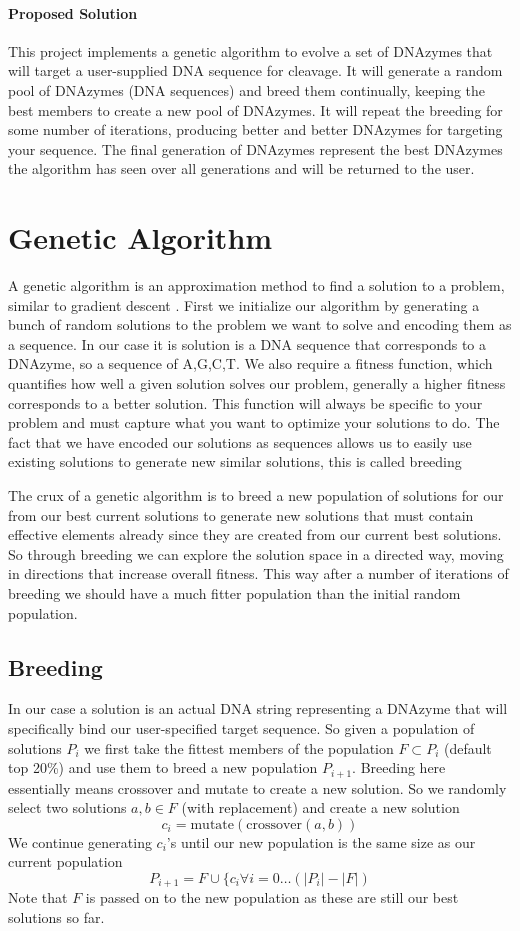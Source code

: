 \documentclass[11pt]{article}
\begin{document}
\paragraph{\textbf{Proposed Solution}}
This project implements a genetic algorithm to evolve a set of DNAzymes that will target a user-supplied DNA sequence for cleavage.
It will generate a random pool of DNAzymes (DNA sequences) and breed them continually, keeping the best members to create a new pool of DNAzymes.
It will repeat the breeding for some number of iterations, producing better and better DNAzymes for targeting your sequence.
The final generation of DNAzymes represent the best DNAzymes the algorithm has seen over all generations and will be returned to the user.

\section*{Genetic Algorithm}
A genetic algorithm is an approximation method to find a solution to a problem, similar to gradient descent \citep{ga}.
First we initialize our algorithm by generating a bunch of random solutions to the problem we want to solve and encoding them as a sequence.
In our case it is solution is a DNA sequence that corresponds to a DNAzyme, so a sequence of A,G,C,T.
We also require a fitness function, which quantifies how well a given solution solves our problem, generally a higher fitness corresponds to a better solution.
This function will always be specific to your problem and must capture what you want to optimize your solutions to do.
The fact that we have encoded our solutions as sequences allows us to easily use existing solutions to generate new similar solutions, this is called breeding
\par
The crux of a genetic algorithm is to breed a new population of solutions for our from our best current solutions to generate new solutions that must contain effective elements already since they are created from our current best solutions.
So through breeding we can explore the solution space in a directed way, moving in directions that increase overall fitness.
This way after a number of iterations of breeding we should have a much fitter population than the initial random population.

\subsection*{Breeding}
In our case a solution is an actual DNA string representing a DNAzyme that will specifically bind our user-specified target sequence.
So given a population of solutions $P_i$ we first take the fittest members of the population $F \subset P_i$ (default top 20\%) and use them to breed a new population $P_{i+1}$.
Breeding here essentially means crossover and mutate to create a new solution.
So we randomly select two solutions $a,b \in F$ (with replacement)  and create a new solution
$$c_i=\text{mutate}(\text{crossover}(a,b))$$
We continue generating $c_i$'s until our new population is the same size as our current population
$$P_{i+1} = F \cup \{c_i \forall i=0\ldots (|P_i|-|F|)$$
Note that $F$ is passed on to the new population as these are still our best solutions so far.
\end{document}
